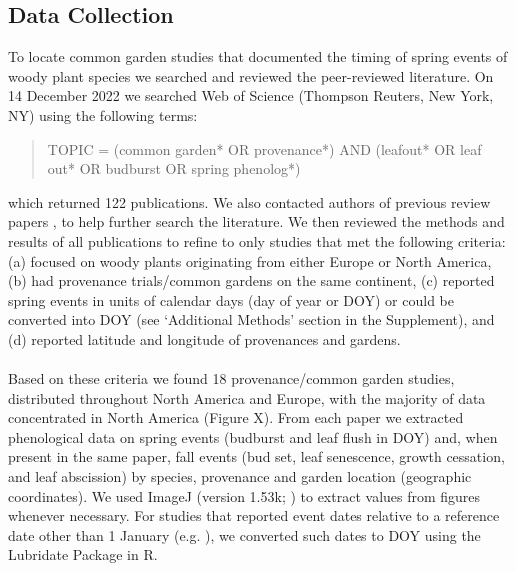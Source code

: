 \documentclass{article}
\begin{document}
\subsection{Data Collection}
To locate common garden studies that documented the timing of spring events of woody plant species we searched and reviewed the peer-reviewed literature. On 14 December 2022 we searched Web of Science (Thompson Reuters, New York, NY) using the following terms:
\begin{quote}
TOPIC = (common garden* OR provenance*) AND (leafout* OR leaf out* OR budburst OR spring phenolog*)
\end{quote}
which returned 122 publications. We also contacted authors of previous review papers \citep{AitkenBemmels16, Alberto13}, to help further search the literature. We then reviewed the methods and results of all publications to refine to only studies that met the following criteria: (a) focused on woody plants originating from either Europe or North America, (b) had provenance trials/common gardens on the same continent, (c) reported spring events in units of calendar days (day of year or DOY) or could be converted into DOY (see `Additional Methods' section in the Supplement), and (d) reported latitude and longitude of provenances and gardens. 
\\
\\
Based on these criteria we found 18 provenance/common garden studies, distributed throughout North America and Europe, with the majority of data concentrated in North America (Figure X). From each paper we extracted phenological data on spring events (budburst and leaf flush in DOY) and, when present in the same paper, fall events (bud set, leaf senescence, growth cessation, and leaf abscission) by species, provenance and garden location (geographic coordinates). We used ImageJ (version 1.53k; \citealp{schneider_rasband_eliceiri_2012}) to extract values from figures whenever necessary. For studies that reported event dates relative to a reference date other than 1 January (e.g. \citealp{Rehfeldt1994}), we converted such dates to DOY using the Lubridate Package in R.
\end{document}
